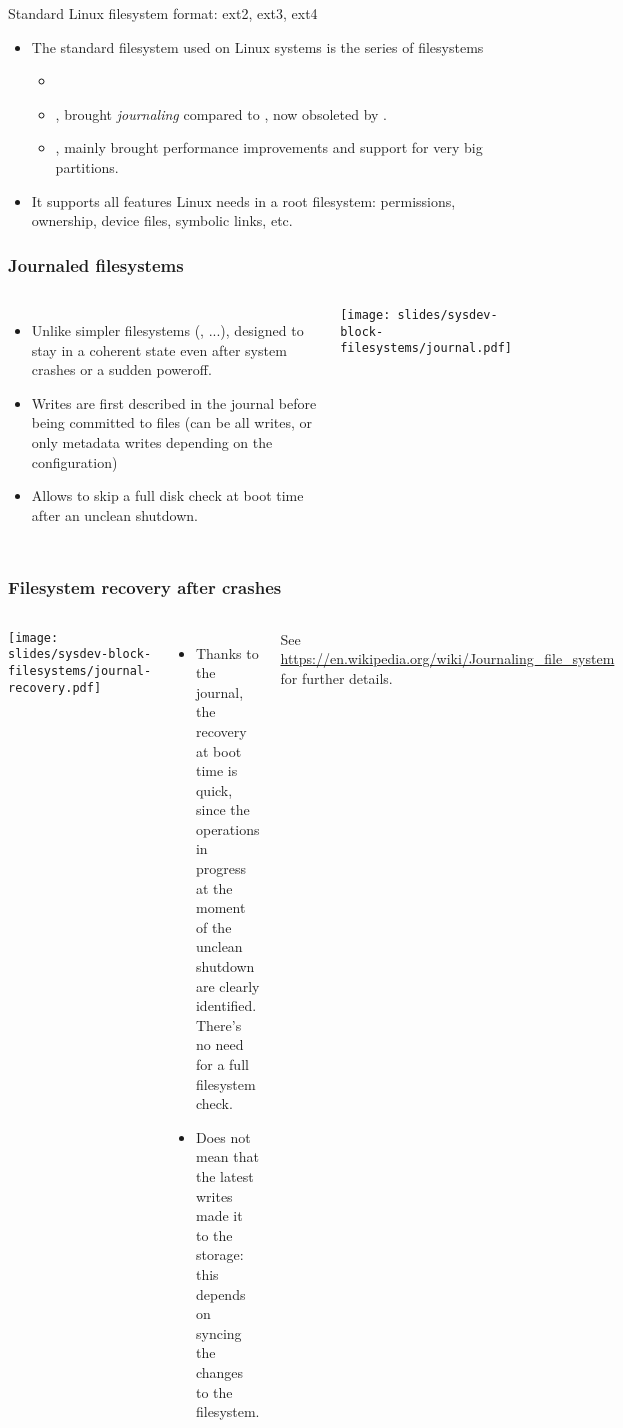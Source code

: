 \begin{frame}{Standard Linux filesystem format: ext2, ext3, ext4}
  \begin{itemize}
  \item The standard filesystem used on Linux systems is the series of
     filesystems
    \begin{itemize}
    \item {}
    \item {}, brought {\em journaling} compared to ,
	  now obsoleted by .
    \item {}, mainly brought performance improvements and
          support for very big partitions.
    \end{itemize}
  \item It supports all features Linux needs in a root filesystem:
    permissions, ownership, device files, symbolic links, etc.
  \end{itemize}
\end{frame}

\begin{frame}
  \frametitle{Journaled filesystems}
  \begin{columns}
    \begin{itemize}
    \item Unlike simpler filesystems (, ...),
      designed to stay in a coherent state even after system
      crashes or a sudden poweroff.
    \item Writes are first described in the journal before being
      committed to files (can be all writes, or only metadata writes
      depending on the configuration)
    \item Allows to skip a full disk check at boot time after an
      unclean shutdown.
    \end{itemize}
    \texttt{[image: slides/sysdev-block-filesystems/journal.pdf]}
  \end{columns}
\end{frame}

\begin{frame}
  \frametitle{Filesystem recovery after crashes}
  \begin{columns}
    \texttt{[image: slides/sysdev-block-filesystems/journal-recovery.pdf]}
    \begin{itemize}
    \item Thanks to the journal, the recovery at boot time is quick,
      since the operations in progress at the moment of the unclean
      shutdown are clearly identified. There's no need for a full
      filesystem check.
    \item Does not mean that the latest writes made it to the storage:
      this depends on syncing the changes to the filesystem.
    \end{itemize}
    See \url{https://en.wikipedia.org/wiki/Journaling_file_system}
    for further details.
  \end{columns}
\end{frame}


